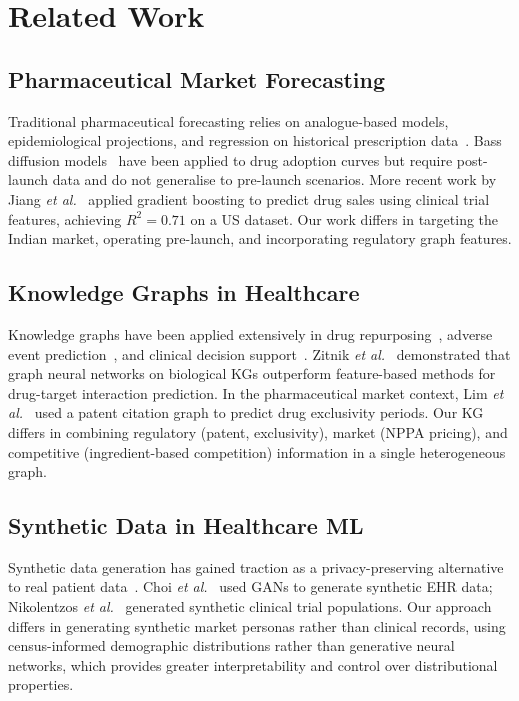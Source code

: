 \documentclass[10pt,journal,compsoc]{IEEEtran}
\newcommand{\etal}{\textit{et al.}}
\begin{document}
\section{Related Work}
\label{sec:related}

\subsection{Pharmaceutical Market Forecasting}

Traditional pharmaceutical forecasting relies on analogue-based models,
epidemiological projections, and regression on historical prescription
data~\cite{rao2021}.
Bass diffusion models~\cite{bass1969} have been applied to drug adoption curves but
require post-launch data and do not generalise to pre-launch scenarios.
More recent work by Jiang \etal~\cite{jiang2020} applied gradient boosting to predict
drug sales using clinical trial features, achieving $R^{2}=0.71$ on a US dataset.
Our work differs in targeting the Indian market, operating pre-launch, and
incorporating regulatory graph features.

\subsection{Knowledge Graphs in Healthcare}

Knowledge graphs have been applied extensively in drug repurposing~\cite{zitnik2018},
adverse event prediction~\cite{mullen2020}, and clinical decision
support~\cite{miller2002}.
Zitnik \etal~\cite{zitnik2019} demonstrated that graph neural networks on biological
KGs outperform feature-based methods for drug-target interaction prediction.
In the pharmaceutical market context, Lim \etal~\cite{lim2018} used a patent citation
graph to predict drug exclusivity periods.
Our KG differs in combining regulatory (patent, exclusivity), market (NPPA pricing),
and competitive (ingredient-based competition) information in a single heterogeneous
graph.

\subsection{Synthetic Data in Healthcare ML}

Synthetic data generation has gained traction as a privacy-preserving alternative to
real patient data~\cite{beaulieuJones2019}.
Choi \etal~\cite{choi2017} used GANs to generate synthetic EHR data;
Nikolentzos \etal~\cite{nikolentzos2021} generated synthetic clinical trial
populations.
Our approach differs in generating synthetic market personas rather than clinical
records, using census-informed demographic distributions rather than generative neural
networks, which provides greater interpretability and control over distributional
properties.
\end{document}
